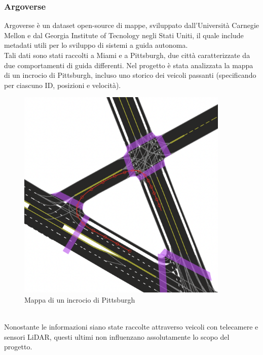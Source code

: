 \documentclass[italian]{article}
\begin{document}
\subsubsection{Argoverse}
Argoverse è un dataset open-source di mappe, sviluppato dall'Università Carnegie Mellon e dal Georgia Institute of Tecnology negli Stati Uniti, il quale include metadati utili per lo sviluppo di sistemi a guida autonoma.\\
Tali dati sono stati raccolti a Miami e a Pittsburgh, due città caratterizzate da due comportamenti di guida differenti. Nel progetto è stata analizzata la mappa di un incrocio di Pittsburgh, incluso uno storico dei veicoli passanti (specificando per ciascuno ID, posizioni e velocità).\\
\begin{figure}[H]
	\centering
	\includegraphics[width=0.9\textwidth]{Pittsburgh}
	\footnotesize
	\caption{Mappa di un incrocio di Pittsburgh}
\end{figure}\\
Nonostante le informazioni siano state raccolte attraverso veicoli con telecamere e sensori LiDAR, questi ultimi non influenzano assolutamente lo scopo del progetto.
\end{document}
